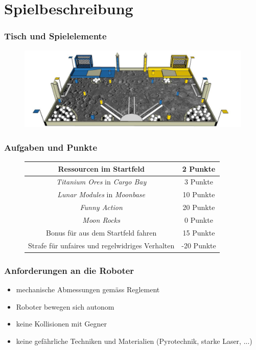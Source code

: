 \section{Spielbeschreibung}

\begin{frame}
	\frametitle{Tisch und Spielelemente}
	\begin{figure}
		\centering
		\includegraphics[width = 13cm]{../images/presentation/spielfeldElemente.jpg}
	\end{figure}
	
\end{frame}

\begin{frame}
	\frametitle{Aufgaben und Punkte}
	
	\begin{figure}[H]
		\centering
		\begin{tabular}{|c|c|}
			\hline
			Ressourcen im Startfeld & 2 Punkte\\
			\hline
			\textit{Titanium Ores} in \textit{Cargo Bay} & 3 Punkte\\
			\hline
			\textit{Lunar Modules} in \textit{Moonbase} & 10 Punkte\\
			\hline
			\textit{Funny Action} & 20 Punkte\\
			\hline
			\hline
			\textit{Moon Rocks} & 0 Punkte\\
			\hline
			Bonus für aus dem Startfeld fahren & 15 Punkte\\
			\hline
			Strafe für unfaires und regelwidriges Verhalten & -20 Punkte\\
			\hline
		\end{tabular}	
	\end{figure}
\end{frame}

\begin{frame}
	\frametitle{Anforderungen an die Roboter}
	
	\begin{itemize}
		\item mechanische Abmessungen gemäss Reglement
		\item Roboter bewegen sich autonom
		\item keine Kollisionen mit Gegner
		\item keine gefährliche Techniken und Materialien (Pyrotechnik, starke Laser, ...)
	\end{itemize}
	
\end{frame}

